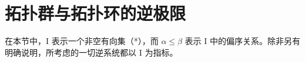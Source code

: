 \section{拓扑群与拓扑环的逆极限}

在本节中，I 表示一个非空有向集（*），而 \(\alpha \leqslant \beta\) 表示 I 中的偏序关系。除非另有明确说明，所考虑的一切逆系统都以 I 为指标。
\relax{}

